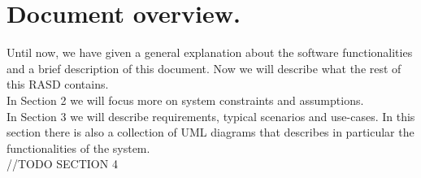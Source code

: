 	\section{Document overview.}
	Until now, we have given a general explanation about the software functionalities and a brief description of this document. Now we will describe what the rest of this RASD contains.\\
	In Section 2 we will focus more on system constraints and assumptions.\\
	In Section 3 we will describe requirements, typical scenarios and use-cases. In this section there is also a collection of UML diagrams that describes in particular the functionalities of the system.\\
	//TODO SECTION 4